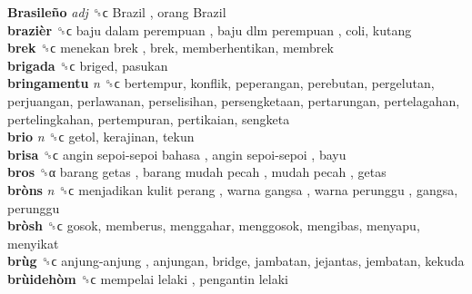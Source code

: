 \textbf{Brasileño} \emph{adj}  ␝ϲ   Brazil ,  orang Brazil   \\
\textbf{brazièr} ␝ϲ   baju dalam perempuan ,  baju dlm perempuan , coli, kutang  \\
\textbf{brek} ␝ϲ   menekan brek , brek, memberhentikan, membrek  \\
\textbf{brigada} ␝ϲ  briged, pasukan  \\
\textbf{bringamentu} \emph{n}  ␝ϲ  bertempur, konflik, peperangan, perebutan, pergelutan, perjuangan, perlawanan, perselisihan, persengketaan, pertarungan, pertelagahan, pertelingkahan, pertempuran, pertikaian, sengketa  \\
\textbf{brio} \emph{n}  ␝ϲ  getol, kerajinan, tekun  \\
\textbf{brisa} ␝ϲ   angin sepoi-sepoi bahasa ,  angin sepoi-sepoi , bayu  \\
\textbf{bros} ␝α   barang getas ,  barang mudah pecah ,  mudah pecah , getas  \\
\textbf{bròns} \emph{n}  ␝ϲ   menjadikan kulit perang ,  warna gangsa ,  warna perunggu , gangsa, perunggu  \\
\textbf{bròsh} ␝ϲ  gosok, memberus, menggahar, menggosok, mengibas, menyapu, menyikat  \\
\textbf{brùg} ␝ϲ   anjung-anjung , anjungan, bridge, jambatan, jejantas, jembatan, kekuda  \\
\textbf{brùidehòm} ␝ϲ   mempelai lelaki ,  pengantin lelaki   \\
